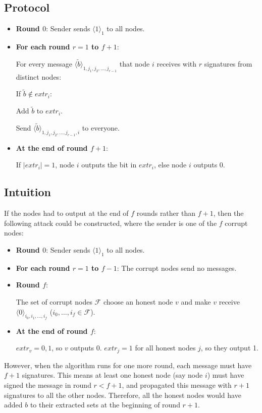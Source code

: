\documentclass{article}
\begin{document}
\subsection{Protocol}


\begin{itemize}
	\item \textbf{Round $0$}: Sender sends $\langle 1 \rangle_1$ to all nodes.

	\item \textbf{For each round $r = 1$ to $f+1$}:

	For every message $\langle \tilde{b} \rangle_{1, j_1, j_2, \dots, j_{r-1}}$ that node $i$ receives with $r$ signatures from distinct nodes:

	\hspace{0.5in} If $\tilde{b} \notin extr_i$:

	\hspace{1in}Add $\tilde{b}$ to $extr_i$.

	\hspace{1in}Send $\langle \tilde{b} \rangle_{1, j_1, j_2, \dots, j_{r-1}, i}$ to everyone.

	\item \textbf{At the end of round $f+1$}:

	If $|extr_i| = 1$, node $i$ outputs the bit in $extr_i$, else node $i$ outputs 0.
\end{itemize}


\subsection{Intuition}
If the nodes had to output at the end of $f$ rounds rather than $f+1$, then the following attack could be constructed, where the sender is one of the $f$ corrupt nodes:

\begin{itemize}
	\item \textbf{Round $0$}: Sender sends $\langle 1 \rangle_1$ to all nodes.

	\item \textbf{For each round $r = 1$ to $f-1$}:	The corrupt nodes send no messages.

	\item \textbf{Round $f$}:

	The set of corrupt nodes $\mathcal{F}$ choose an honest node $v$ and make $v$ receive $\langle 0 \rangle_{i_0, i_1, \dots, i_f}$ ($i_0, \dots, i_f \in \mathcal{F}$).

	\item \textbf{At the end of round $f$}:

	$extr_v = {0, 1}$, so $v$ outputs 0.
	$extr_j = {1}$ for all honest nodes $j$, so they output 1.
\end{itemize}

However, when the algorithm runs for one more round, each message must have $f+1$ signatures. This means at least one honest node (say node $i$) must have signed the message in round $r < f+1$, and propagated this message with $r+1$ signatures to all the other nodes. Therefore, all the honest nodes would have added $b$ to their extracted sets at the beginning of round $r+1$.

\end{document}
